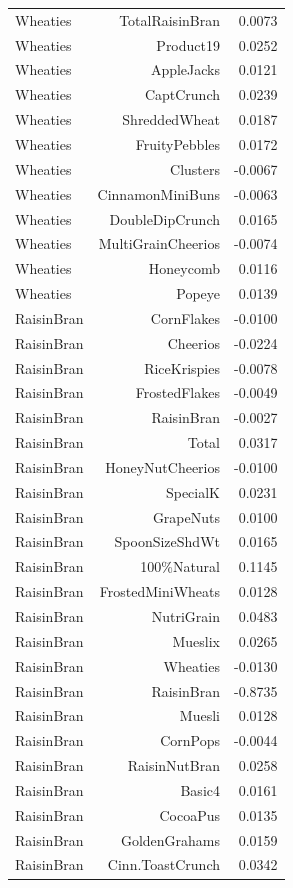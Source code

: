 \begin{longtable}{@{}lrr@{}}
Wheaties & TotalRaisinBran & 0.0073 \\
Wheaties & Product19 & 0.0252 \\
Wheaties & AppleJacks & 0.0121 \\
Wheaties & CaptCrunch & 0.0239 \\
Wheaties & ShreddedWheat & 0.0187 \\
Wheaties & FruityPebbles & 0.0172 \\
Wheaties & Clusters & -0.0067 \\
Wheaties & CinnamonMiniBuns & -0.0063 \\
Wheaties & DoubleDipCrunch & 0.0165 \\
Wheaties & MultiGrainCheerios & -0.0074 \\
Wheaties & Honeycomb & 0.0116 \\
Wheaties & Popeye & 0.0139 \\
RaisinBran & CornFlakes & -0.0100 \\
RaisinBran & Cheerios & -0.0224 \\
RaisinBran & RiceKrispies & -0.0078 \\
RaisinBran & FrostedFlakes & -0.0049 \\
RaisinBran & RaisinBran & -0.0027 \\
RaisinBran & Total & 0.0317 \\
RaisinBran & HoneyNutCheerios & -0.0100 \\
RaisinBran & SpecialK & 0.0231 \\
RaisinBran & GrapeNuts & 0.0100 \\
RaisinBran & SpoonSizeShdWt & 0.0165 \\
RaisinBran & 100\%Natural & 0.1145 \\
RaisinBran & FrostedMiniWheats & 0.0128 \\
RaisinBran & NutriGrain & 0.0483 \\
RaisinBran & Mueslix & 0.0265 \\
RaisinBran & Wheaties & -0.0130 \\
RaisinBran & RaisinBran & -0.8735 \\
RaisinBran & Muesli & 0.0128 \\
RaisinBran & CornPops & -0.0044 \\
RaisinBran & RaisinNutBran & 0.0258 \\
RaisinBran & Basic4 & 0.0161 \\
RaisinBran & CocoaPus & 0.0135 \\
RaisinBran & GoldenGrahams & 0.0159 \\
RaisinBran & Cinn.ToastCrunch & 0.0342 \\

\end{longtable}
